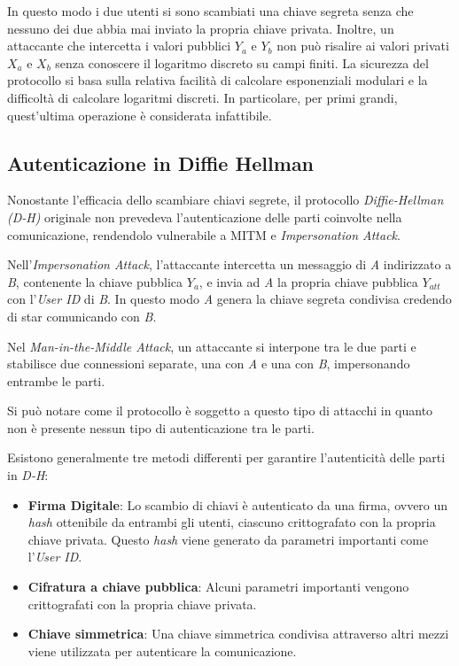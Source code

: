 In questo modo i due utenti si sono scambiati una chiave segreta senza che nessuno dei due abbia mai inviato la propria chiave privata.
Inoltre, un attaccante che intercetta i valori pubblici $Y_a$ e $Y_b$ non può risalire ai valori privati $X_a$ e $X_b$ senza conoscere il logaritmo discreto su campi finiti.
La sicurezza del protocollo si basa sulla relativa facilità di calcolare esponenziali modulari e la difficoltà di calcolare logaritmi discreti. In particolare, per primi grandi, quest'ultima operazione è considerata infattibile.


\subsection{Autenticazione in Diffie Hellman}
Nonostante l'efficacia dello scambiare chiavi segrete, il protocollo \emph{Diffie-Hellman (D-H)} originale non prevedeva l'autenticazione delle parti coinvolte nella comunicazione, rendendolo vulnerabile a MITM e \emph{\gls{Impersonation Attack}}.

Nell'\emph{Impersonation Attack}, l'attaccante intercetta un messaggio di \emph{A} indirizzato a \emph{B}, contenente la chiave pubblica $Y_a$, e invia ad \emph{A} la propria chiave pubblica $Y_{att}$ con l'\emph{User ID} di \emph{B}.
In questo modo \emph{A} genera la chiave segreta condivisa credendo di star comunicando con \emph{B}.

Nel \emph{Man-in-the-Middle Attack}, un attaccante si interpone tra le due parti e stabilisce due connessioni separate, una con \emph{A} e una con \emph{B}, impersonando entrambe le parti.

Si può notare come il protocollo è soggetto a questo tipo di attacchi in quanto non è presente nessun tipo di autenticazione tra le parti.

\noindent Esistono generalmente tre metodi differenti per garantire l'autenticità delle parti in \emph{D-H}:
\begin{itemize}
	\item \textbf{Firma Digitale}: Lo scambio di chiavi è autenticato da una firma, ovvero un \emph{hash} ottenibile da entrambi gli utenti, ciascuno crittografato con la propria chiave privata. Questo \emph{hash} viene generato da parametri importanti come l'\emph{User ID}.
	\item \textbf{Cifratura a chiave pubblica}: Alcuni parametri importanti vengono crittografati con la propria chiave privata.
	\item \textbf{Chiave simmetrica}: Una chiave simmetrica condivisa attraverso altri mezzi viene utilizzata per autenticare la comunicazione.
\end{itemize}

